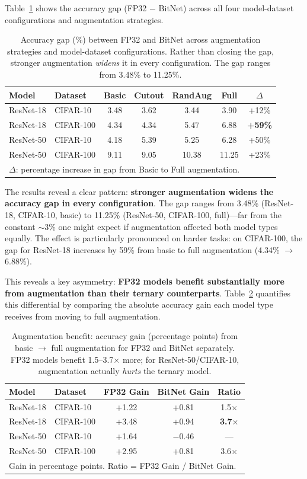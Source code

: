 \documentclass[10pt]{article}
\begin{document}
Table~\ref{tab:augmentation} shows the accuracy gap (FP32 $-$ BitNet) across all four model-dataset configurations and augmentation strategies.

\begin{table}[ht]
\centering
\caption{Accuracy gap (\%) between FP32 and BitNet across augmentation strategies and model-dataset configurations. Rather than closing the gap, stronger augmentation \emph{widens} it in every configuration. The gap ranges from 3.48\% to 11.25\%.}
\label{tab:augmentation}
\begin{tabular}{llccccc}
\toprule
Model & Dataset & Basic & Cutout & RandAug & Full & $\Delta$ \\
\midrule
ResNet-18 & CIFAR-10  & 3.48 & 3.62 & 3.44 & 3.90 & +12\% \\
ResNet-18 & CIFAR-100 & 4.34 & 4.34 & 5.47 & 6.88 & \textbf{+59\%} \\
ResNet-50 & CIFAR-10  & 4.18 & 5.39 & 5.25 & 6.28 & +50\% \\
ResNet-50 & CIFAR-100 & 9.11 & 9.05 & 10.38 & 11.25 & +23\% \\
\bottomrule
\multicolumn{7}{l}{\footnotesize $\Delta$: percentage increase in gap from Basic to Full augmentation.}
\end{tabular}
\end{table}

The results reveal a clear pattern: \textbf{stronger augmentation widens the accuracy gap in every configuration}. The gap ranges from 3.48\% (ResNet-18, CIFAR-10, basic) to 11.25\% (ResNet-50, CIFAR-100, full)---far from the constant $\sim$3\% one might expect if augmentation affected both model types equally. The effect is particularly pronounced on harder tasks: on CIFAR-100, the gap for ResNet-18 increases by 59\% from basic to full augmentation (4.34\% $\to$ 6.88\%).

This reveals a key asymmetry: \textbf{FP32 models benefit substantially more from augmentation than their ternary counterparts}. Table~\ref{tab:aug_benefit} quantifies this differential by comparing the absolute accuracy gain each model type receives from moving to full augmentation.

\begin{table}[ht]
\centering
\caption{Augmentation benefit: accuracy gain (percentage points) from basic $\to$ full augmentation for FP32 and BitNet separately. FP32 models benefit 1.5--3.7$\times$ more; for ResNet-50/CIFAR-10, augmentation actually \emph{hurts} the ternary model.}
\label{tab:aug_benefit}
\begin{tabular}{llccc}
\toprule
Model & Dataset & FP32 Gain & BitNet Gain & Ratio \\
\midrule
ResNet-18 & CIFAR-10  & +1.22 & +0.81 & 1.5$\times$ \\
ResNet-18 & CIFAR-100 & +3.48 & +0.94 & \textbf{3.7$\times$} \\
ResNet-50 & CIFAR-10  & +1.64 & $-$0.46 & --- \\
ResNet-50 & CIFAR-100 & +2.95 & +0.81 & 3.6$\times$ \\
\bottomrule
\multicolumn{5}{l}{\footnotesize Gain in percentage points. Ratio = FP32 Gain / BitNet Gain.}
\end{tabular}
\end{table}
\end{document}
